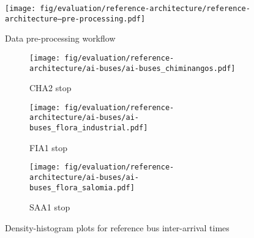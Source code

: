 \begin{figure}[b]
	\centering
	\texttt{[image: fig/evaluation/reference-architecture/reference-architecture--pre-processing.pdf]}
	\caption{Data pre-processing workflow}
	\label{fig:evaluation--suts-pre-processing}
\end{figure}

\begin{table}[h]
	\centering
	\caption{Reference probability distributions used for simulations}
	\label{tab:evaluation--suts-probability-distributions}
\end{table}

\begin{figure}[h]
	\centering
	\begin{subfigure}[b]{0.3\textwidth}
		\centering
		\texttt{[image: fig/evaluation/reference-architecture/ai-buses/ai-buses\_chiminangos.pdf]}
		\caption{CHA2 stop}
		\label{tab:evaluation--suts-ai-buses_CHA2}
	\end{subfigure}
	\begin{subfigure}[b]{0.3\textwidth}
		\centering
		\texttt{[image: fig/evaluation/reference-architecture/ai-buses/ai-buses\_flora\_industrial.pdf]}
		\caption{FIA1 stop}
		\label{tab:evaluation--suts-ai-buses_FIA1}
	\end{subfigure}
	\begin{subfigure}[b]{0.3\textwidth}
		\centering
		\texttt{[image: fig/evaluation/reference-architecture/ai-buses/ai-buses\_flora\_salomia.pdf]}
		\caption{SAA1 stop}
		\label{tab:evaluation--suts-ai-buses_SAA1}
	\end{subfigure}
	\caption{Density-histogram plots for reference bus inter-arrival times}
	\label{tab:evaluation--suts-ai-buses}
\end{figure}

